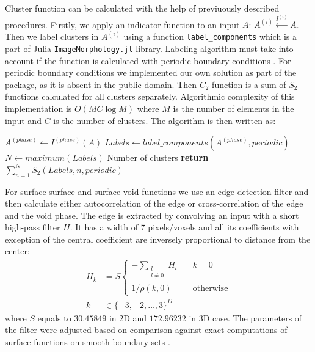 \documentclass[1p]{elsarticle}
\newcommand{\code}[1]{\colorbox{light-gray}{\texttt{#1}}}
\begin{document}
Cluster function can be calculated with the help of previuously described
procedures.  Firstly, we apply an indicator function to an input $A$:
$A^{(i)} \xleftarrow{I^{(i)}} A$. Then we label clusters in $A^{(i)}$ using a
function \code{label\_components} which is a part of Julia
\code{ImageMorphology.jl} library.  Labeling algorithm must take into account if
the function is calculated with periodic boundary conditions
\cite{evstigneev2023}. For periodic boundary conditions we implemented our own
solution as part of the package, as it is absent in the public domain. Then
$C_2$ function is a sum of $S_2$ functions calculated for all clusters
separately. Algorithmic complexity of this implementation is $O(MC\log M)$ where
$M$ is the number of elements in the input and $C$ is the number of
clusters. The algorithm is then written as:
\begin{algorithmic}[1]
  \State $A^{(phase)} \gets I^{(phase)} (A)$
  \State $Labels \gets label\_components(A^{(phase)}, periodic)$
  \State $N \gets maximum(Labels)$ \Comment Number of clusters
  \State \textbf{return} $\sum\limits_{n=1}^N S_2(Labels, n, periodic)$
  \EndProcedure
\end{algorithmic}

For surface-surface and surface-void functions we use an edge detection filter
\cite{samarin2023robust} and then calculate either autocorrelation of the edge
or cross-correlation of the edge and the void phase. The edge is extracted by
convolving an input with a short high-pass filter $H$. It has a width of 7
pixels/voxels and all its coefficients with exception of the central coefficient
are inversely proportional to distance from the center:
\begin{equation}
  \begin{aligned}
    H_k &= S \left\{
    \begin{array}{ll}
      -\sum\limits_{\substack{l \\ l \ne 0}} H_l & \quad k = 0 \\
      1 / \rho(k, 0) & \quad \text{otherwise}
    \end{array}
    \right. \\
    k &\in \{-3, -2, \dots, 3\}^D
  \end{aligned}
  \label{eq:filter-7x7}
\end{equation}
where $S$ equals to $30.45849$ in 2D and $172.96232$ in 3D case. The parameters
of the filter were adjusted based on comparison against exact computations of
surface functions on smooth-boundary sets \cite{postcov23}.
\end{document}
